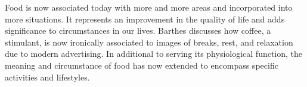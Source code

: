 \documentclass[letterpaper, 12pt]{article}
\begin{document}
Food is now associated today with more and more areas and incorporated into more situations. It represents an improvement in the quality of life and adds significance to circumstances in our lives. Barthes discusses how coffee, a stimulant, is now ironically associated to images of breaks, rest, and relaxation due to modern advertising. In additional to serving its physiological function, the meaning and circumstance of food has now extended to encompass specific activities and lifestyles.
\end{document}
